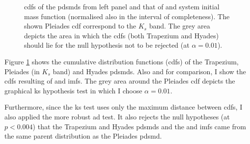 \begin{figure}[htp]
\begin{center}
\caption{\glspl{cdf} of the \glspl{pdsmd} from left panel and that of \citet{Chabrier2005} and \citet{Thies2007} system initial mass function (normalised also in the interval of completeness). The shown Pleiades \gls{cdf} correspond to the $K_s$ band. The grey area depicts the area in which the \glspl{cdf} (both Trapezium and Hyades) should lie for the null hypothesis not to be rejected (at $\alpha=0.01$).}
\label{fig:PDSMDtest}
\end{center}
\end{figure}


Figure \ref{fig:PDSMDtest} shows the cumulative distribution functions (\glspl{cdf}) of the Trapezium, Pleiades (in $K_s$ band) and Hyades \glspl{pdsmd}. Also and for comparison, I show the \glspl{cdf} resulting of \citet{Chabrier2005} and \citet{Thies2007} \glspl{imf}. The grey area around the Pleiades \gls{cdf} depicts the graphical \gls{ks} hypothesis test in which I choose $\alpha = 0.01$.

Furthermore, since the \gls{ks} test uses only the maximum distance between \glspl{cdf}, I also applied the more robust \gls{ad} test. It also rejects the null hypotheses (at $p < 0.004$) that the Trapezium and Hyades \glspl{pdsmd} and the \citet{Chabrier2005} and \citet{Thies2007} \glspl{imf} came from the same parent distribution as the Pleiades \gls{pdsmd}. 

